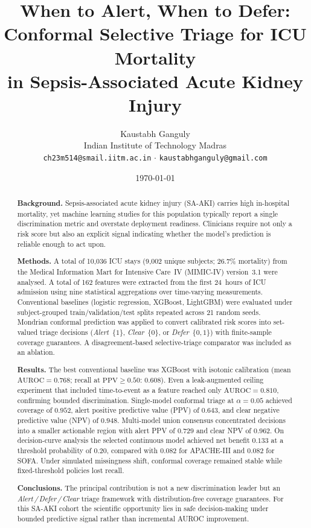\documentclass[11pt]{article}
\title{When to Alert, When to Defer:\\
       Conformal Selective Triage for ICU Mortality\\
       in Sepsis-Associated Acute Kidney Injury}
\author{Kaustabh Ganguly\\
        Indian Institute of Technology Madras\\
        \texttt{ch23m514@smail.iitm.ac.in} $\cdot$ \texttt{kaustabhganguly@gmail.com}}
\date{\today}
\newcommand{\AUROC}{\text{AUROC}}
\begin{document}
\maketitle

\begin{abstract}
\noindent
\textbf{Background.}
Sepsis-associated acute kidney injury (SA-AKI) carries high in-hospital mortality,
yet machine learning studies for this population typically report a single
discrimination metric and overstate deployment readiness.  Clinicians require not
only a risk score but also an explicit signal indicating whether the model's
prediction is reliable enough to act upon.

\textbf{Methods.}
A total of 10,036 ICU stays (9,002 unique subjects; 26.7\% mortality) from the
Medical Information Mart for Intensive Care~IV (MIMIC-IV) version~3.1 were analysed.  A total
of 162 features were extracted from the first 24~hours of ICU admission using nine
statistical aggregations over time-varying measurements.  Conventional baselines
(logistic regression, XGBoost, LightGBM) were evaluated under subject-grouped
train/validation/test splits repeated across 21 random seeds.  Mondrian conformal
prediction was applied to convert calibrated risk scores into set-valued triage
decisions (\emph{Alert}~$\{1\}$, \emph{Clear}~$\{0\}$, or
\emph{Defer}~$\{0,1\}$) with finite-sample coverage guarantees.  A
disagreement-based selective-triage comparator was included as an ablation.

\textbf{Results.}
The best conventional baseline was XGBoost with isotonic calibration (mean
$\AUROC = 0.768$; recall at $\text{PPV} \ge 0.50$: $0.608$).  Even a
leak-augmented ceiling experiment that included time-to-event as a feature reached
only $\AUROC = 0.810$, confirming bounded discrimination.  Single-model conformal
triage at $\alpha = 0.05$ achieved coverage of $0.952$, alert positive predictive
value (PPV) of $0.643$, and clear negative predictive value (NPV) of $0.948$.
Multi-model union consensus concentrated decisions into a smaller actionable region
with alert PPV of $0.729$ and clear NPV of $0.962$.  On decision-curve analysis
the selected continuous model achieved net benefit $0.133$ at a threshold
probability of $0.20$, compared with $0.082$ for APACHE-III and $0.082$ for SOFA.
Under simulated missingness shift, conformal coverage remained stable while
fixed-threshold policies lost recall.

\textbf{Conclusions.}
The principal contribution is not a new discrimination leader but an
\emph{Alert\,/\,Defer\,/\,Clear} triage framework with distribution-free coverage
guarantees.  For this SA-AKI cohort the scientific opportunity lies in safe
decision-making under bounded predictive signal rather than incremental AUROC
improvement.
\end{abstract}
\end{document}
